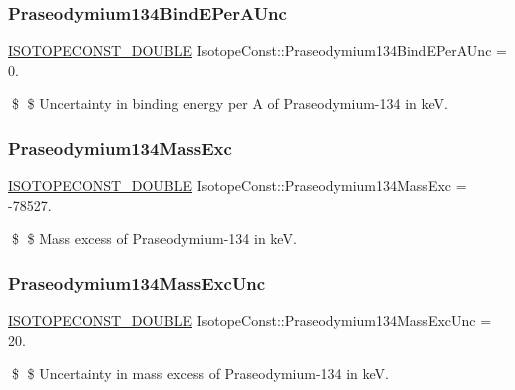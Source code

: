 \subsubsection{\texorpdfstring{Praseodymium134\+Bind\+E\+Per\+A\+Unc}{Praseodymium134BindEPerAUnc}}
{\footnotesize\ttfamily \mbox{\hyperlink{group___isotope_const-_macros_ga8f45a7272ce02c0b4c65c44636ed719a}{I\+S\+O\+T\+O\+P\+E\+C\+O\+N\+S\+T\+\_\+\+D\+O\+U\+B\+LE}} Isotope\+Const\+::\+Praseodymium134\+Bind\+E\+Per\+A\+Unc = 0.}

\$ \$ Uncertainty in binding energy per A of Praseodymium-\/134 in keV. \mbox{\label{group___isotope_const-_praseodymium-_pr134_ga0c90fce95fb83428fb16effeb253e025}} 
\subsubsection{\texorpdfstring{Praseodymium134\+Mass\+Exc}{Praseodymium134MassExc}}
{\footnotesize\ttfamily \mbox{\hyperlink{group___isotope_const-_macros_ga8f45a7272ce02c0b4c65c44636ed719a}{I\+S\+O\+T\+O\+P\+E\+C\+O\+N\+S\+T\+\_\+\+D\+O\+U\+B\+LE}} Isotope\+Const\+::\+Praseodymium134\+Mass\+Exc = -\/78527.}

\$ \$ Mass excess of Praseodymium-\/134 in keV. \mbox{\label{group___isotope_const-_praseodymium-_pr134_gaaa0884f0398e8cd4cfffa3d1d53a1ef6}} 
\subsubsection{\texorpdfstring{Praseodymium134\+Mass\+Exc\+Unc}{Praseodymium134MassExcUnc}}
{\footnotesize\ttfamily \mbox{\hyperlink{group___isotope_const-_macros_ga8f45a7272ce02c0b4c65c44636ed719a}{I\+S\+O\+T\+O\+P\+E\+C\+O\+N\+S\+T\+\_\+\+D\+O\+U\+B\+LE}} Isotope\+Const\+::\+Praseodymium134\+Mass\+Exc\+Unc = 20.}

\$ \$ Uncertainty in mass excess of Praseodymium-\/134 in keV. \mbox{\label{group___isotope_const-_praseodymium-_pr134_ga1a1efb0244118b294a86cbeec2ff5c27}} 
